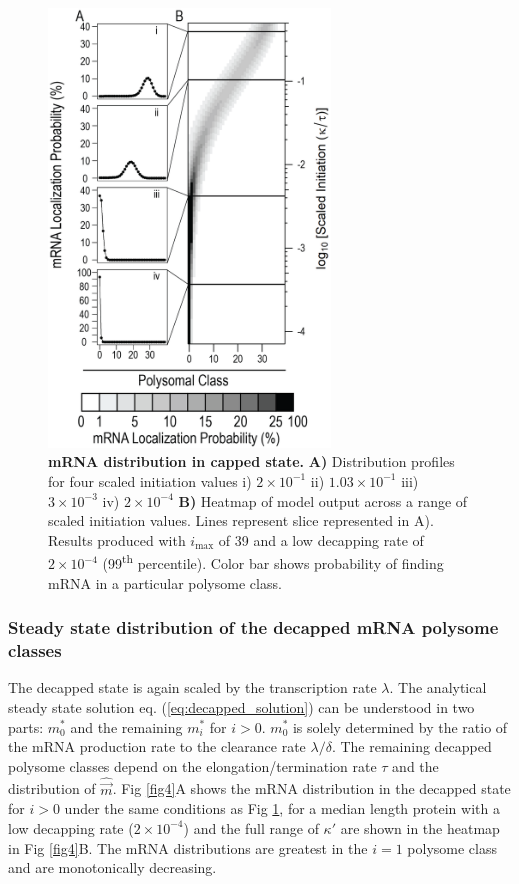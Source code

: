\documentclass[10pt,letterpaper]{article}
\newcommand{\imax}{\ensuremath{{i_{\max}}}\xspace}
\newcommand{\mvec}{\ensuremath{\vec{m}}\xspace}
\newcommand{\mvechat}{\ensuremath{\hat{\mvec}}\xspace}
\begin{document}
\begin{figure}[!h]
  \begin{center}
    \includegraphics[width=75mm]{Images/2023-07-04_Unmarked_slices.png}
    \caption{{\bf mRNA distribution in capped state.} {\bf A)} Distribution profiles for four scaled initiation values i) $2\times 10^{-1}$ ii) $1.03\times 10^{-1}$ iii) $3\times 10^{-3}$ iv) $2\times 10^{-4}$ {\bf B)} Heatmap of model output across a range of scaled initiation values.
      Lines represent slice represented in A).
      Results produced with \imax of 39 and a low decapping rate of $2\times10^{-4}$  (99\textsuperscript{th} percentile).
      Color bar shows probability of finding mRNA in a particular polysome class.}
    \label{fig3}
  \end{center}
\end{figure}


\subsubsection*{Steady state distribution of the decapped mRNA polysome classes}
The decapped state is again scaled by the transcription rate $\lambda$.
The analytical steady state solution eq. (\ref{eq:decapped_solution}) can be understood in two parts: $m_0^*$ and the remaining $m_i^*$ for $i>0$.
$m_0^*$ is solely determined by the ratio of the mRNA production rate to the clearance rate $\lambda / \delta$.
The remaining decapped polysome classes depend on the elongation/termination rate $\tau$ and the distribution of \mvechat.
Fig \ref{fig4}A shows the mRNA distribution in the decapped state for $i>0$ under the same conditions as Fig \ref{fig3}, for a median length protein with a low decapping rate ($2\times10^{-4}$) and the full range of $\kappa'$ are shown in the heatmap in Fig \ref{fig4}B.
The mRNA distributions are greatest in the $i=1$ polysome class and are monotonically decreasing. 
\end{document}
